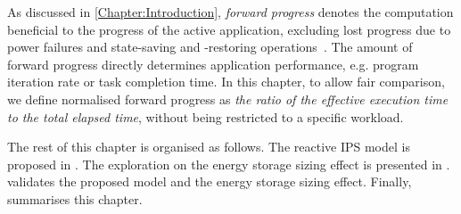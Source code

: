 As discussed in \cref{Chapter:Introduction}, \textit{forward progress} denotes the computation beneficial to the progress of the active application, excluding lost progress due to power failures and state-saving and -restoring operations~\cite{7478428}. 
The amount of forward progress directly determines application performance, e.g. program iteration rate or task completion time. 
In this chapter, to allow fair comparison, we define normalised forward progress as \textit{the ratio of the effective execution time to the total elapsed time}, without being restricted to a specific workload. 

The rest of this chapter is organised as follows. 
The reactive IPS model is proposed in .
The exploration on the energy storage sizing effect is presented in .
 validates the proposed model and the energy storage sizing effect. 
Finally,  summarises this chapter. 




